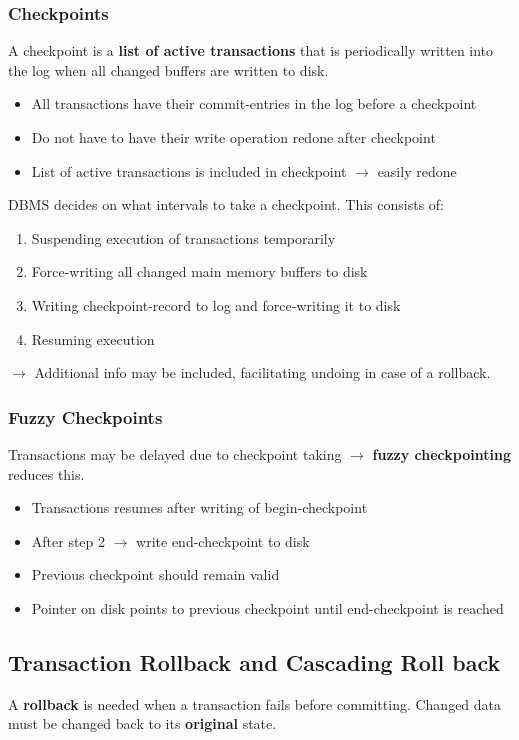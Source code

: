 \subsubsection{Checkpoints}
A checkpoint is a \textbf{list of active transactions	} that is periodically written into the log when all changed buffers are written to disk.
\begin{itemize}
	\item 	All transactions have their commit-entries in the log before a checkpoint
	\item Do not have to have their write operation redone after checkpoint
	\item List of active transactions is included in checkpoint $\rightarrow$ easily redone
\end{itemize}
DBMS decides on what intervals to take a checkpoint. This consists of:
\begin{enumerate}
	\item Suspending execution of transactions temporarily
	\item Force-writing all changed main memory buffers to disk
	\item Writing checkpoint-record to log and force-writing it to disk
	\item Resuming execution
\end{enumerate}
$\rightarrow$ Additional info may be included, facilitating undoing in case of a rollback.
\subsubsection{Fuzzy Checkpoints}
Transactions may be delayed due to checkpoint taking $\rightarrow$ \textbf{fuzzy checkpointing} reduces this.
\begin{itemize}
	\item Transactions resumes after writing of begin-checkpoint
	\item After step 2 $\rightarrow$ write end-checkpoint to disk
	\item Previous checkpoint should remain valid
	\item Pointer on disk points to previous checkpoint until end-checkpoint is reached
\end{itemize}
\subsection{Transaction Rollback and Cascading Roll back}
A \textbf{rollback} is needed when a transaction fails before committing. Changed data must be changed back to its \textbf{original} state.
